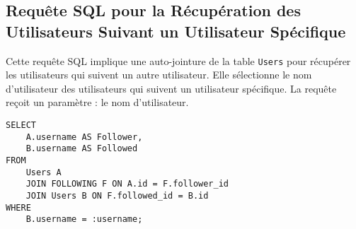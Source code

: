 \subsection{Requête SQL pour la Récupération des Utilisateurs Suivant un Utilisateur Spécifique}

Cette requête SQL implique une auto-jointure de la table \texttt{Users} pour récupérer les utilisateurs qui suivent un autre utilisateur. Elle sélectionne le nom d'utilisateur des utilisateurs qui suivent un utilisateur spécifique. La requête reçoit un paramètre : le nom d'utilisateur.

\begin{lstlisting}
SELECT
    A.username AS Follower,
    B.username AS Followed
FROM
    Users A
    JOIN FOLLOWING F ON A.id = F.follower_id
    JOIN Users B ON F.followed_id = B.id
WHERE
    B.username = :username;
\end{lstlisting}